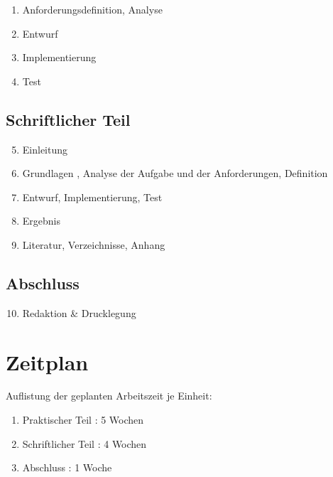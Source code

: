 \begin{enumerate}
\item Anforderungsdefinition, Analyse	
\item Entwurf 
\item Implementierung
\item Test

\end{enumerate}	

\subsection{Schriftlicher Teil}

\begin{enumerate}
\setcounter{enumi}{4}
\item Einleitung
\item Grundlagen , Analyse der Aufgabe und der Anforderungen,  Definition	
\item Entwurf,  Implementierung,  Test
\item Ergebnis  
\item Literatur, Verzeichnisse, Anhang
\end{enumerate}	
\subsection{Abschluss}
\begin{enumerate}
\setcounter{enumi}{9}
\item Redaktion \& Drucklegung

\end{enumerate}

\section{Zeitplan}

Auflistung der geplanten Arbeitszeit je Einheit:
\begin{enumerate}
\item Praktischer Teil : 5 Wochen
\item Schriftlicher Teil : 4 Wochen
\item Abschluss : 1 Woche
\end{enumerate}

